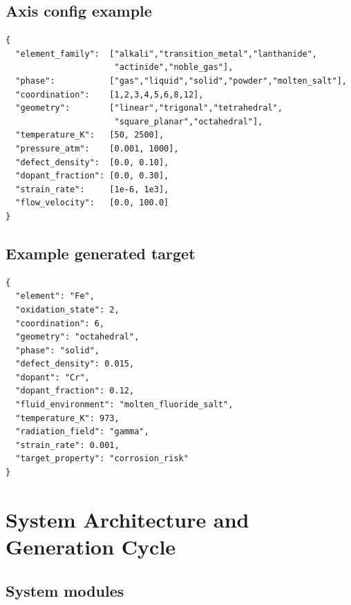 \documentclass[11pt, a4paper]{article}
\begin{document}
\subsection{Axis config example}

\begin{lstlisting}[language={},basicstyle=\ttfamily\footnotesize]
{
  "element_family":  ["alkali","transition_metal","lanthanide",
                      "actinide","noble_gas"],
  "phase":           ["gas","liquid","solid","powder","molten_salt"],
  "coordination":    [1,2,3,4,5,6,8,12],
  "geometry":        ["linear","trigonal","tetrahedral",
                      "square_planar","octahedral"],
  "temperature_K":   [50, 2500],
  "pressure_atm":    [0.001, 1000],
  "defect_density":  [0.0, 0.10],
  "dopant_fraction": [0.0, 0.30],
  "strain_rate":     [1e-6, 1e3],
  "flow_velocity":   [0.0, 100.0]
}
\end{lstlisting}

\subsection{Example generated target}

\begin{lstlisting}[language={},basicstyle=\ttfamily\footnotesize]
{
  "element": "Fe",
  "oxidation_state": 2,
  "coordination": 6,
  "geometry": "octahedral",
  "phase": "solid",
  "defect_density": 0.015,
  "dopant": "Cr",
  "dopant_fraction": 0.12,
  "fluid_environment": "molten_fluoride_salt",
  "temperature_K": 973,
  "radiation_field": "gamma",
  "strain_rate": 0.001,
  "target_property": "corrosion_risk"
}
\end{lstlisting}

\section{System Architecture and Generation Cycle}

\subsection{System modules}
\end{document}

